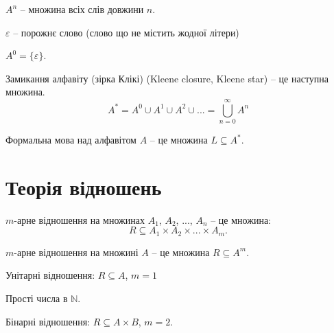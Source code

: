 \begin{definition}
    $A^n$ -- множина всіх слів довжини $n$.
\end{definition}

\begin{definition}
    $\varepsilon$ -- порожнє слово (слово що не містить жодної літери)
\end{definition}

\begin{remark}
    $A^0 = \{\varepsilon\}$.
\end{remark}

\begin{definition}
    Замикання алфавіту (зірка Клікі) (Kleene closure, Kleene star) -- це наступна множина.
    $$A^* = A^0 \cup A^1 \cup A^2 \cup ... = \bigcup\limits_{n=0}^{\infty} A^n$$
\end{definition}

\begin{definition}
    Формальна мова над алфавітом $A$ -- це множина $L \subseteq A^*$.
\end{definition}

\section{Теорія відношень}

\begin{definition}
    $m$-арне відношення на множинах $A_1$, $A_2$, ..., $A_n$ -- це множина:
    $$R \subseteq A_1 \times A_2 \times ... \times A_m.$$
\end{definition}

\begin{definition}
    $m$-арне відношення на множині $A$ -- це множина $R \subseteq A^m$.
\end{definition}

\begin{definition}
    Унітарні відношення: $R \subseteq A$, $m = 1$
\end{definition}

\begin{example}
    Прості числа в $\mathbb{N}$.
\end{example}

\begin{definition}
    Бінарні відношення: $R \subseteq A \times B$, $m = 2$.    
\end{definition}

